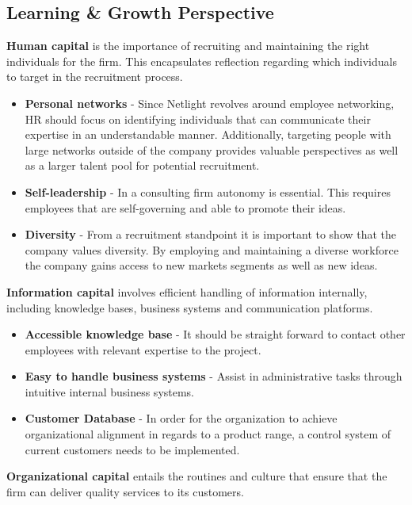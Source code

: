 \documentclass[12pt]{article}
\begin{document}
\subsection*{Learning \& Growth Perspective}
\textbf{Human capital} is the importance of recruiting  and maintaining the right individuals for the firm. This encapsulates reflection regarding which individuals to target in the recruitment process.
\begin{itemize}
\item \textbf{Personal networks} - Since Netlight revolves around employee networking, HR should focus on identifying individuals that can communicate their expertise in an understandable manner. Additionally, targeting people with large networks outside of the company provides valuable perspectives as well as a larger talent pool for potential recruitment.
\item \textbf{Self-leadership} - In a consulting firm autonomy is essential. This requires employees that are self-governing and able to promote their ideas. 
\item \textbf{Diversity} - From a recruitment standpoint it is important to show that the company values diversity. By employing and maintaining a diverse workforce the company gains access to new markets segments as well as new ideas.
\end{itemize}
\noindent
\textbf{Information capital} involves efficient handling of information internally, including knowledge bases, business systems and communication platforms.
\begin{itemize}
\item \textbf{Accessible knowledge base} - It should be straight forward to contact other employees with relevant expertise to the project. 
\item \textbf{Easy to handle business systems} - Assist in administrative tasks through intuitive internal business systems.
\item \textbf{Customer Database} - In order for the organization to achieve organizational alignment in regards to a product range, a control system of current customers needs to be implemented.
\end{itemize}

\noindent
\textbf{Organizational capital} entails the routines and culture that ensure that the firm can deliver quality services to its customers.
\end{document}
